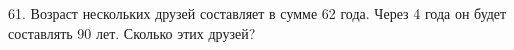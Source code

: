 61. Возраст нескольких друзей составляет в сумме 62 года. Через 4 года он будет составлять 90 лет. Сколько этих друзей?\\
